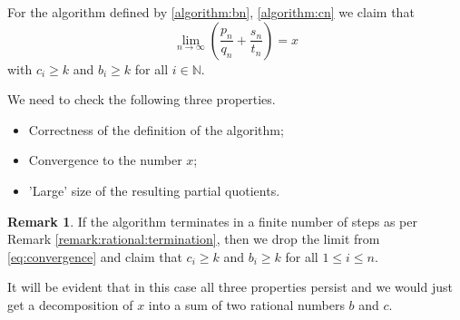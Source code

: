 \documentclass{amsart}
\theoremstyle{definition}
\newtheorem{remark}[theorem]{Remark}
\newtheorem{claim}[theorem]{Claim}
\newcommand{\N}{\mathbb N}%
\newcommand{\0}{\mbf 0}%
\renewcommand{\text}{\textup}
\def\N{\mathbb N}
\begin{document}
For the algorithm defined by \eqref{algorithm:bn}, \eqref{algorithm:cn} we claim that 
\begin{equation}\label{eq:convergence}
\lim_{n\to\infty} \left( \frac{p_n}{q_n} + \frac{s_n}{t_n} \right) = x
\end{equation}
with $c_i\geq k$ and $b_i\geq k$ for all $i\in\N$.





We need to check the following three properties.
\begin{itemize}
    \item  Correctness of the definition of the algorithm;

    \item Convergence to the number $x$;
    
    \item 'Large' size of the resulting partial quotients.
\end{itemize}


\begin{remark}
    If the algorithm terminates in a finite number of steps as per Remark \ref{remark:rational:termination}, then we drop the limit from \eqref{eq:convergence} and claim that $c_i\geq k$ and $b_i\geq k$ for all $1\leq i \leq n$.

It will be evident that in this case all three properties persist and we would just get a decomposition of $x$ into a sum of two rational numbers $b$ and $c$.
\end{remark}
\end{document}
